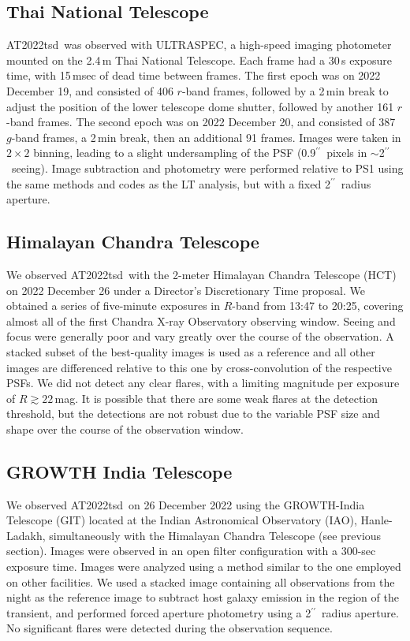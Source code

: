 \documentclass{nature_plusfigure}
\newcommand{\at}{AT2022tsd}
\newcommand{\arcsec}{$^{\prime\prime}$}
\begin{document}
\begin{methods}
\subsection{Thai National Telescope}

\at\ was observed with ULTRASPEC\cite{Dhillon2014}, a high-speed imaging photometer mounted on the 2.4\,m Thai National Telescope. Each frame had a 30\,s exposure time, with 15\,msec of dead time between frames. The first epoch was on 2022 December 19, and consisted of 406 $r$-band frames, followed by a 2\,min break to adjust the position of the lower telescope dome shutter, followed by another 161 $r$-band frames. The second epoch was on 2022 December 20, and consisted of 387 $g$-band frames, a 2\,min break, then an additional 91 frames.  Images were taken in $2\times2$ binning, leading to a slight undersampling of the PSF (0.9\arcsec\ pixels in $\sim$2\arcsec\ seeing).  Image subtraction and photometry were performed relative to PS1 using the same methods and codes as the LT analysis, but with a fixed 2\arcsec\ radius aperture.

\subsection{Himalayan Chandra Telescope}
\label{sec:HCT}

We observed \at\ with the 2-meter Himalayan Chandra Telescope (HCT) on 2022 December 26 under a Director's Discretionary Time proposal. We obtained a series of five-minute exposures in $R$-band from 13:47 to 20:25, covering almost all of the first Chandra X-ray Observatory observing window.  Seeing and focus were generally poor and vary greatly over the course of the observation.  A stacked subset of the best-quality images is used as a reference and all other images are differenced relative to this one by cross-convolution of the respective PSFs.   We did not detect any clear flares, with a limiting magnitude per exposure of $R\gtrsim22\,$mag. It is possible that there are some weak flares at the detection threshold, but the detections are not robust due to the variable PSF size and shape over the course of the observation window.

\subsection{GROWTH India Telescope}
\label{sec:GIT}

We observed \at\ on 26 December 2022 using the GROWTH-India Telescope (GIT\cite{Kumar2022}) located at the Indian Astronomical Observatory (IAO), Hanle-Ladakh, simultaneously with the Himalayan Chandra Telescope (see previous section). Images were observed in an open filter configuration with a 300-sec exposure time. Images were analyzed using a method similar to the one employed on other facilities.  We used a stacked image containing all observations from the night as the reference image to subtract host galaxy emission in the region of the transient, and performed forced aperture photometry using a 2\arcsec\ radius aperture.  No significant flares were detected during the observation sequence.


\end{methods}
\end{document}
